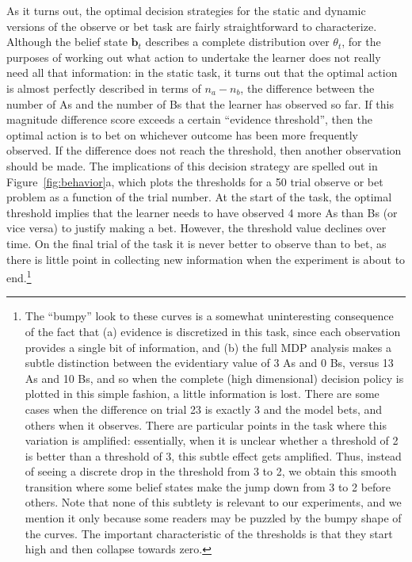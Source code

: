 \documentclass[authoryear]{elsarticle}
\begin{document}
As it turns out, the optimal decision strategies for the static and dynamic versions of the observe or bet task are fairly straightforward to characterize. Although the belief state $\bm{b}_t$ describes a complete distribution over $\theta_t$, for the purposes of working out what action to undertake the learner does not really need all that information: in the static task, it turns out that the optimal action is almost perfectly described in terms of $n_a - n_b$, the difference between the number of As and the number of Bs that the learner has observed so far. If this magnitude difference score exceeds a certain ``evidence threshold'', then the optimal action is to bet on whichever outcome has been more frequently observed. If the difference does not reach the threshold, then another observation should be made. The implications of this decision strategy are spelled out in Figure~\ref{fig:behavior}a, which plots the thresholds for a 50 trial observe or bet problem as a function of the trial number. At the start of the task, the optimal threshold implies that the learner needs to have observed 4 more As than Bs (or vice versa) to justify making a bet. However, the threshold value declines over time. On the final trial of the task it is never better to observe than to bet, as there is little point in collecting new information when the experiment is about to end.\footnote{The ``bumpy'' look to these curves is a somewhat uninteresting consequence of the fact that (a) evidence is discretized in this task, since each observation provides a single bit of information, and (b) the full MDP analysis makes a subtle distinction between the evidentiary value of 3 As and 0 Bs, versus 13 As and 10 Bs, and so when the complete (high dimensional) decision policy is plotted in this simple fashion, a little information is lost. There are some cases when the difference on trial 23 is exactly 3 and the model bets, and others when it observes. There are particular points in the task where this variation is amplified: essentially, when it is unclear whether a threshold of 2 is better than a threshold of 3, this subtle effect gets amplified. Thus, instead of seeing a discrete drop in the threshold from 3 to 2, we obtain this smooth transition where some belief states make the jump down from 3 to 2 before others. Note that none of this subtlety is relevant to our experiments, and we mention it only because some readers may be puzzled by the bumpy shape of the curves. The important characteristic of the thresholds is that they start high and then collapse towards zero.}
\end{document}
